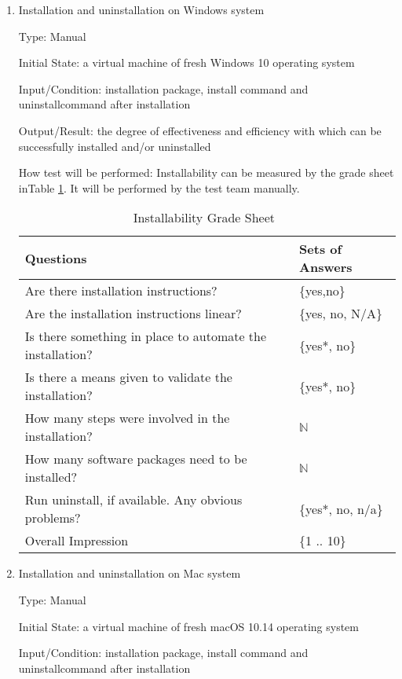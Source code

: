 \documentclass[12pt, titlepage]{article}
\begin{document}
\begin{enumerate}

\item{Installation and uninstallation on Windows system}
\label{sec_InstallWindows}

Type: Manual
					
Initial State: a virtual machine of fresh Windows 10 operating system
					
Input/Condition: \progname{} installation package, install command and
uninstallcommand after installation
					
Output/Result: the degree of effectiveness and efficiency with which
\progname{}can be successfully installed and/or uninstalled
					
How test will be performed: Installability can be measured by the grade sheet
inTable \ref{Tb_install}. It will be performed by the test team manually.

\begin{table}[h]
\begin{tabular}{@{}ll@{}}
\toprule
Questions & Sets of Answers \\ \midrule
Are there installation instructions? & \{yes,no\} \\
Are the installation instructions linear? & \{yes, no, N/A\} \\
Is there something in place to automate the installation? & \{yes*, no\} \\
Is there a means given to validate the installation? & \{yes*, no\} \\
How many steps were involved in the installation? & $\mathbb{N}$ \\
How many software packages need to be installed? & $\mathbb{N}$ \\
Run uninstall, if available. Any obvious problems? & \{yes*, no, n/a\} \\
Overall Impression & \{1 .. 10\}\\ \bottomrule
\end{tabular}
\caption{Installability Grade Sheet~\cite{SmithEtAl2018}}
\label{Tb_install}
\end{table}

\item{Installation and uninstallation on Mac system}

Type: Manual
					
Initial State: a virtual machine of fresh macOS 10.14 operating system
					
Input/Condition: \progname{} installation package, install command and
uninstallcommand after installation
					

\end{enumerate}
\end{document}
